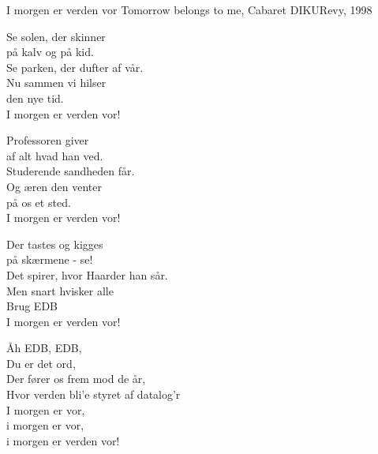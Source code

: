 \begin{song}{I morgen er verden vor}
  {} %
  {Tomorrow belongs to me, Cabaret} %
  {} %
  {DIKURevy, 1998} %
  {\NotCCLIed} %

  \begin{SBVerse}
    Se solen, der skinner\\
    på kalv og på kid.\\
    Se parken, der dufter af vår.\\
    Nu sammen vi hilser\\
    den nye tid.\\
    I morgen er verden vor!
  \end{SBVerse}

  \begin{SBVerse}
    Professoren giver\\
    af alt hvad han ved.\\
    Studerende sandheden får.\\
    Og æren den venter\\
    på os et sted.\\
    I morgen er verden vor!
  \end{SBVerse}

  \begin{SBVerse}
    Der tastes og kigges\\
    på skærmene - se!\\
    Det spirer, hvor Haarder han sår.\\
    Men snart hvisker alle\\
    Brug EDB\\
    I morgen er verden vor!
  \end{SBVerse}

  \begin{SBVerse}
    Åh EDB, EDB,\\
    Du er det ord,\\
    Der fører os frem mod de år,\\
    Hvor verden bli'e styret af datalog'r\\
    I morgen er vor,\\
    i morgen er vor,\\
    i morgen er verden vor!
  \end{SBVerse}
\end{song}